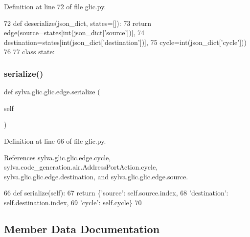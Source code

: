 Definition at line 72 of file glic.\+py.


\begin{DoxyCode}
72     \textcolor{keyword}{def }deserialize(json\_dict, states=[]):
73       \textcolor{keywordflow}{return} edge(source=states[int(json\_dict[\textcolor{stringliteral}{'source'}])],
74                   destination=states[int(json\_dict[\textcolor{stringliteral}{'destination'}])],
75                   cycle=int(json\_dict[\textcolor{stringliteral}{'cycle'}]))
76 
77   \textcolor{keyword}{class }state:
\end{DoxyCode}
\mbox{\label{classsylva_1_1glic_1_1glic_1_1edge_a3fecc788dfeea26b5005b6263dfe3088}} 
\subsubsection{\texorpdfstring{serialize()}{serialize()}}
{\footnotesize\ttfamily def sylva.\+glic.\+glic.\+edge.\+serialize (\begin{DoxyParamCaption}\item[{}]{self }\end{DoxyParamCaption})}



Definition at line 66 of file glic.\+py.



References sylva.\+glic.\+glic.\+edge.\+cycle, sylva.\+code\+\_\+generation.\+air.\+Address\+Port\+Action.\+cycle, sylva.\+glic.\+glic.\+edge.\+destination, and sylva.\+glic.\+glic.\+edge.\+source.


\begin{DoxyCode}
66     \textcolor{keyword}{def }serialize(self):
67       \textcolor{keywordflow}{return} \{\textcolor{stringliteral}{'source'}: self.source.index,
68               \textcolor{stringliteral}{'destination'}: self.destination.index,
69               \textcolor{stringliteral}{'cycle'}: self.cycle\}
70 
\end{DoxyCode}


\subsection{Member Data Documentation}
\mbox{\label{classsylva_1_1glic_1_1glic_1_1edge_a30be603f8a2b6d9c9cc2da06ce2444c1}} 
